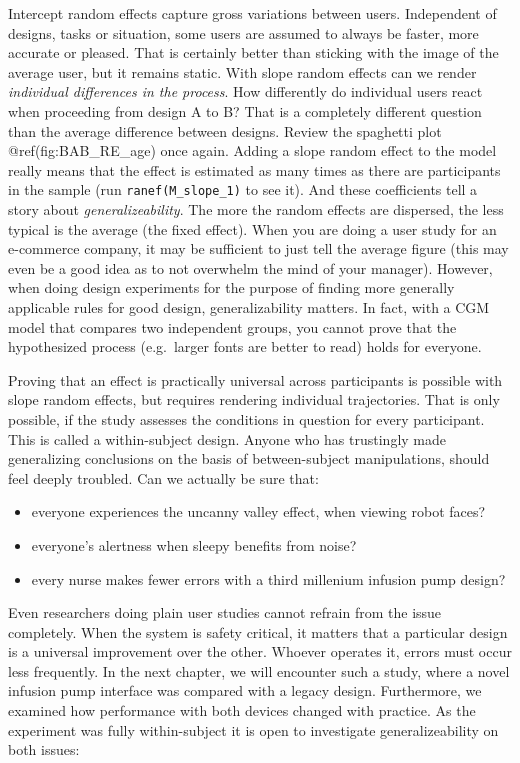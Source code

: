 \documentclass[]{svmono}
\providecommand{\tightlist}{%
  \setlength{\itemsep}{0pt}\setlength{\parskip}{0pt}}
\begin{document}
Intercept random effects capture gross variations between users.
Independent of designs, tasks or situation, some users are assumed to
always be faster, more accurate or pleased. That is certainly better
than sticking with the image of the average user, but it remains static.
With slope random effects can we render \emph{individual differences in
the process}. How differently do individual users react when proceeding
from design A to B? That is a completely different question than the
average difference between designs. Review the spaghetti plot
@ref(fig:BAB\_RE\_age) once again. Adding a slope random effect to the
model really means that the effect is estimated as many times as there
are participants in the sample (run \texttt{ranef(M\_slope\_1)} to see
it). And these coefficients tell a story about \emph{generalizeability}.
The more the random effects are dispersed, the less typical is the
average (the fixed effect). When you are doing a user study for an
e-commerce company, it may be sufficient to just tell the average figure
(this may even be a good idea as to not overwhelm the mind of your
manager). However, when doing design experiments for the purpose of
finding more generally applicable rules for good design,
generalizability matters. In fact, with a CGM model that compares two
independent groups, you cannot prove that the hypothesized process
(e.g.~larger fonts are better to read) holds for everyone.

Proving that an effect is practically universal across participants is
possible with slope random effects, but requires rendering individual
trajectories. That is only possible, if the study assesses the
conditions in question for every participant. This is called a
within-subject design. Anyone who has trustingly made generalizing
conclusions on the basis of between-subject manipulations, should feel
deeply troubled. Can we actually be sure that:

\begin{itemize}
\tightlist
\item
  everyone experiences the uncanny valley effect, when viewing robot
  faces?
\item
  everyone's alertness when sleepy benefits from noise?
\item
  every nurse makes fewer errors with a third millenium infusion pump
  design?
\end{itemize}

Even researchers doing plain user studies cannot refrain from the issue
completely. When the system is safety critical, it matters that a
particular design is a universal improvement over the other. Whoever
operates it, errors must occur less frequently. In the next chapter, we
will encounter such a study, where a novel infusion pump interface was
compared with a legacy design. Furthermore, we examined how performance
with both devices changed with practice. As the experiment was fully
within-subject it is open to investigate generalizeability on both
issues:
\end{document}
